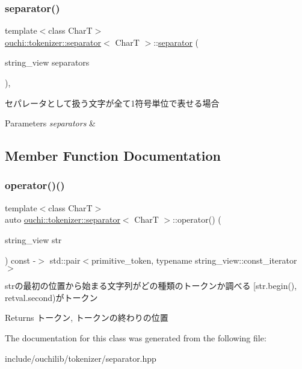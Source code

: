 \subsubsection{\texorpdfstring{separator()}{separator()}}
{\footnotesize\ttfamily template$<$class CharT$>$ \\
\mbox{\hyperlink{classouchi_1_1tokenizer_1_1separator}{ouchi\+::tokenizer\+::separator}}$<$ CharT $>$\+::\mbox{\hyperlink{classouchi_1_1tokenizer_1_1separator}{separator}} (\begin{DoxyParamCaption}\item[{string\+\_\+view}]{separators }\end{DoxyParamCaption})\hspace{0.3cm}{\ttfamily [inline]}, {\ttfamily [explicit]}}



セパレータとして扱う文字が全て1符号単位で表せる場合 


\begin{DoxyParams}{Parameters}
{\em separators} & \\
\hline
\end{DoxyParams}


\subsection{Member Function Documentation}
\mbox{\label{classouchi_1_1tokenizer_1_1separator_ad62842349250e62ba12fcca9f0898d00}} 
\subsubsection{\texorpdfstring{operator()()}{operator()()}}
{\footnotesize\ttfamily template$<$class CharT$>$ \\
auto \mbox{\hyperlink{classouchi_1_1tokenizer_1_1separator}{ouchi\+::tokenizer\+::separator}}$<$ CharT $>$\+::operator() (\begin{DoxyParamCaption}\item[{string\+\_\+view}]{str }\end{DoxyParamCaption}) const -\/$>$ std\+::pair$<$primitive\+\_\+token, typename string\+\_\+view\+::const\+\_\+iterator$>$
    \hspace{0.3cm}{\ttfamily [inline]}}



strの最初の位置から始まる文字列がどの種類のトークンか調べる \mbox{[}str.\+begin(), retval.\+second)がトークン 

\begin{DoxyReturn}{Returns}
トークン, トークンの終わりの位置
\end{DoxyReturn}


The documentation for this class was generated from the following file\+:\begin{DoxyCompactItemize}
\item 
include/ouchilib/tokenizer/separator.\+hpp\end{DoxyCompactItemize}
